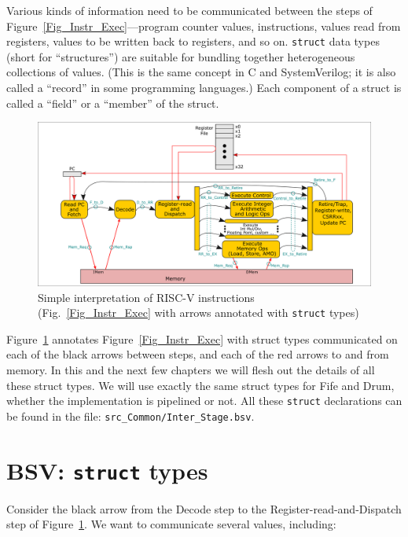 Various kinds of information need to be communicated between the steps
of Figure~\ref{Fig_Instr_Exec}---program counter values, instructions,
values read from registers, values to be written back to registers,
and so on.  \verb|struct| data types (short for ``structures'') are
suitable for bundling together heterogeneous collections of values.
(This is the same concept in C and SystemVerilog; it is also called a
``record'' in some programming languages.)  Each component of a struct
is called a ``field'' or a ``member'' of the struct.
\begin{figure}[htbp]
  \centerline{\includegraphics[width=6in,angle=0]
             {ch030_RISCV_Design_Space/Figures/Fig_Instr_Exec_w_structs}}
  \caption{\label{Fig_Simple_Instr_Exec_w_structs}
           Simple interpretation of RISC-V instructions
	   (Fig.~\ref{Fig_Instr_Exec} with arrows annotated with {\tt struct} types)}
\end{figure}
Figure~\ref{Fig_Simple_Instr_Exec_w_structs} annotates
Figure~\ref{Fig_Instr_Exec} with struct types communicated on each of
the black arrows between steps, and each of the red arrows to and from
memory.  In this and the next few chapters we will flesh out the
details of all these struct types.  We will use exactly the same
struct types for Fife and Drum, {\ie} whether the implementation is
pipelined or not.  All these \verb|struct|
declarations can be found in the file: \verb|src_Common/Inter_Stage.bsv|.


\section{BSV: {\tt struct} types}

\label{BSV_struct_types}

Consider the black arrow from the Decode step to the
Register-read-and-Dispatch step of
Figure~\ref{Fig_Simple_Instr_Exec_w_structs}.
We want to communicate several values, including:

